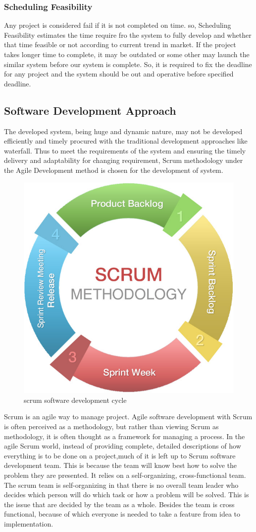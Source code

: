 \subsubsection{Scheduling Feasibility}
Any project is considered fail if it is not completed on time. so, Scheduling Feasibility estimates the time require fro the system to fully develop and whether that time feasible or not according to current trend in market. If the project takes longer time to complete, it may be outdated or some other may launch the similar system before our system is complete. So, it is required to fix the deadline for any project and the system should be out and operative before specified deadline.

\subsection{Software Development Approach}
The developed system, being huge and dynamic nature, may not be developed efficiently and timely procured with the traditional development approaches like waterfall. Thus to meet the requirements of the system and ensuring the timely delivery and adaptability for changing requirement, Scrum methodology under the Agile Development method is chosen for the development of system.


\begin{figure}[!ht]
\centering
\includegraphics[width = 5 cm]{fig/scrum-chart.jpg}
\caption{scrum software development cycle}
\label{fig:scrum}
\end{figure}
Scrum is an agile way to manage project. Agile software development with Scrum is often perceived as a methodology, but rather than viewing Scrum as methodology, it is often thought as a framework for managing a process. In the agile Scrum world, instead of providing complete, detailed descriptions of how everything is to be done on a project,much of it is left up to Scrum software development team. This is because the team will know best how to solve the problem they are presented. It relies on a self-organizing, cross-functional team. The scrum team is self-organizing in that there is no overall team leader who decides which person will do which task or how a problem will be solved. This is the issue that are decided by the team as a whole. Besides the team is cross functional, because of which everyone is needed to take a feature from idea to implementation. 

